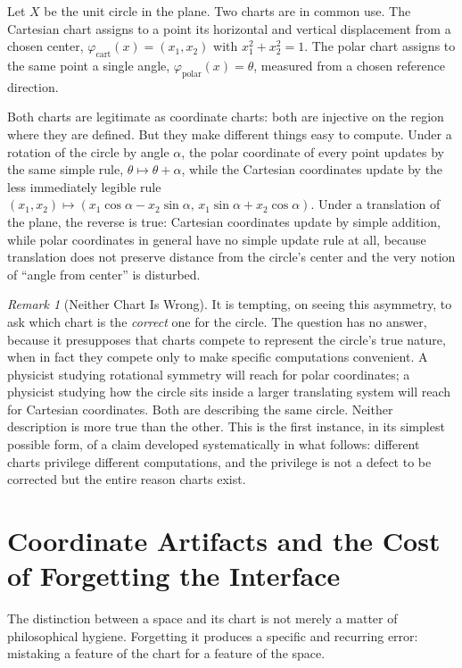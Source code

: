 \documentclass[11pt,fleqn]{book}
\numberwithin{equation}{chapter}
\theoremstyle{plain}
\theoremstyle{definition}
\theoremstyle{remark}
\newtheorem{remark}[theorem]{Remark}
\providecommand{\enquote}[1]{``#1''}
\begin{document}
Let \(X\) be the unit circle in the plane. Two charts are in common use. The Cartesian chart assigns to a point its horizontal and vertical displacement from a chosen center, \(\varphi_{\mathrm{cart}}(x)=(x_1,x_2)\) with \(x_1^2+x_2^2=1\). The polar chart assigns to the same point a single angle, \(\varphi_{\mathrm{polar}}(x)=\theta\), measured from a chosen reference direction.

Both charts are legitimate as coordinate charts: both are injective on the region where they are defined. But they make different things easy to compute. Under a rotation of the circle by angle \(\alpha\), the polar coordinate of every point updates by the same simple rule, \(\theta \mapsto \theta+\alpha\), while the Cartesian coordinates update by the less immediately legible rule \((x_1,x_2)\mapsto(x_1\cos\alpha - x_2\sin\alpha,\, x_1\sin\alpha+x_2\cos\alpha)\). Under a translation of the plane, the reverse is true: Cartesian coordinates update by simple addition, while polar coordinates in general have no simple update rule at all, because translation does not preserve distance from the circle's center and the very notion of \enquote{angle from center} is disturbed.

\begin{remark}[Neither Chart Is Wrong]
It is tempting, on seeing this asymmetry, to ask which chart is the \emph{correct} one for the circle. The question has no answer, because it presupposes that charts compete to represent the circle's true nature, when in fact they compete only to make specific computations convenient. A physicist studying rotational symmetry will reach for polar coordinates; a physicist studying how the circle sits inside a larger translating system will reach for Cartesian coordinates. Both are describing the same circle. Neither description is more true than the other. This is the first instance, in its simplest possible form, of a claim developed systematically in what follows: different charts privilege different computations, and the privilege is not a defect to be corrected but the entire reason charts exist.
\end{remark}

\section{Coordinate Artifacts and the Cost of Forgetting the Interface}

The distinction between a space and its chart is not merely a matter of philosophical hygiene. Forgetting it produces a specific and recurring error: mistaking a feature of the chart for a feature of the space.
\end{document}
